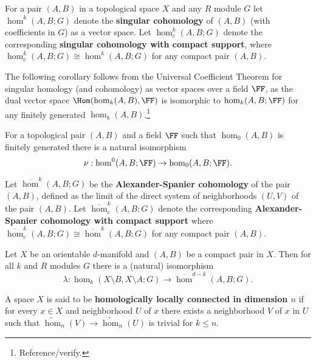 

For a pair $(A, B)$ in a topological space $X$ and any $R$ module $G$ let $\hom^k(A, B; G)$ denote the \textbf{singular cohomology} of $(A,B)$ (with coefficients in $G$) as a vector space.
Let $\hom^k_c(A, B; G)$ denote the corresponding \textbf{singular cohomology with compact support}, where $\hom^k_c(A, B; G)\cong \hom^k(A, B; G)$ for any compact pair $(A,B)$.

The following corollary follows from the Universal Coefficient Theorem for singular homology (and cohomology) as vector spaces over a field $\FF$, as the dual vector space $\Hom(\hom_k(A, B), \FF)$ is isomorphic to $\hom_k(A, B; \FF)$ for any finitely generated $\hom_k(A, B)$.\footnote{Reference/verify.}

\begin{corollary}\label{cor:univ_coef}
  For a topological pair $(A, B)$ and a field $\FF$ such that $\hom_0(A, B)$ is finitely generated there is a natural isomorphism
  \[\nu : \hom^0(A, B; \FF)\to \hom_0(A, B; \FF).\]
\end{corollary}

Let $\overline{\hom}^k(A, B; G)$ be the \textbf{Alexander-Spanier cohomology} of the pair $(A,B)$, defined as the limit of the direct system of neighborhoods $(U,V)$ of the pair $(A, B)$.
Let $\overline{\hom}^k_c(A, B; G)$ denote the corresponding \textbf{Alexander-Spanier cohomology with compact support} where $\overline{\hom}^k_c(A, B; G)\cong\overline{\hom}^k(A, B; G)$ for any compact pair $(A, B)$.

\begin{theorem}\label{thm:alexander}
  Let $X$ be an orientable $d$-manifold and $(A, B)$ be a compact pair in $X$.
  Then for all $k$ and $R$ modules $G$ there is a (natural) isomorphism
  \[\lambda : \hom_k(X\setminus B, X\setminus A; G)\to \overline{\hom}^{d-k}(A, B; G).\]
\end{theorem}

A space $X$ is said to be \textbf{homologically locally connected in dimension $n$} if for every $x\in X$ and neighborhood $U$ of $x$ there exists a neighborhood $V$ of $x$ in $U$ such that $\tilde{\hom}_n(V)\to\tilde{\hom}_n(U)$ is trivial for $k\leq n$.


